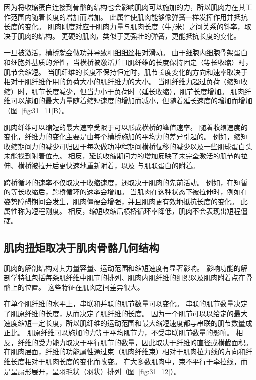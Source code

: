因为将收缩蛋白连接到骨骼的结构也会影响肌肉可以施加的力，所以肌肉力在其工作范围内随着长度的增加而增加。
此属性使肌肉能够像弹簧一样发挥作用并抵抗长度的变化。
肌肉刚度对应于肌肉力量与肌肉长度（牛/米）之间关系的斜率，取决于肌肉的结构。
更硬的肌肉，类似于更强壮的弹簧，更能抵抗长度的变化。


一旦被激活，横桥就会做功并导致粗细细丝相对滑动。
由于细胞内细胞骨架蛋白和细胞外基质的弹性，当横桥被激活并且肌纤维的长度保持固定（等长收缩）时，肌节会缩短。
当肌纤维的长度不保持恒定时，肌节长度变化的方向和速率取决于相对于肌纤维作用的负荷大小的肌纤维力的大小。
当肌纤维力超过负荷（缩短收缩）时，肌节长度减少，但当力小于负荷时（延长收缩），肌节长度增加。
肌肉纤维可以施加的最大力量随着缩短速度的增加而减小，但随着延长速度的增加而增加（图~\ref{fig:31_11}B）。


肌肉纤维可以缩短的最大速率受限于可以形成横桥的峰值速率。
随着收缩速度的变化，纤维力的变化主要是由每个横桥施加的平均力的差异引起的。
例如，缩短收缩期间力的减少可归因于每次做功冲程期间横桥位移的减少以及一些肌球蛋白头未能找到附着位点。
相反，延长收缩期间力的增加反映了未完全激活的肌节的拉伸、横桥被拉开后更快速地重新附着，以及  与肌联蛋白的附着。


跨桥循环的速率不仅取决于收缩速度，还取决于肌肉的先前活动。
例如，在短暂的等长收缩后，跨桥循环的速率会增加。
当肌肉在这种状态下被拉伸时，例如在姿势障碍期间会发生，肌肉僵硬会增强，并且肌肉更有效地抵抗长度的变化。
此属性称为短程刚度。
相反，缩短收缩后横桥循环率降低，肌肉不会表现出短程僵硬。



\subsection{肌肉扭矩取决于肌肉骨骼几何结构}

肌肉的解剖结构对其力量容量、运动范围和缩短速度有显著影响。
影响功能的解剖学特征包括每条肌纤维中肌节的排列、肌肉内肌纤维的组织以及肌肉附着点在骨骼上的位置。
这些特征在肌肉之间差异很大。


在单个肌纤维的水平上，串联和并联的肌节数量可以变化。
串联的肌节数量决定了肌原纤维的长度，从而决定了肌纤维的长度。
因为一个肌节可以以给定的最大速度缩短一定长度，所以肌纤维的运动范围和最大缩短速度都与串联的肌节数量成正比。
肌原纤维可以施加的力等于平均肌节力，不受串联肌节数量的影响。
相反，纤维的受力能力取决于平行肌节的数量，因此取决于纤维的直径或横截面积。
在肌肉层面，纤维的功能属性通过束（肌肉纤维束）相对于肌肉拉力线的方向和纤维长度相对于肌肉长度的变化而改变。
在大多数肌肉中，束不平行于牵拉线，而是呈扇形展开，呈羽毛状（羽状）排列（图~\ref{fig:31_12}）。


